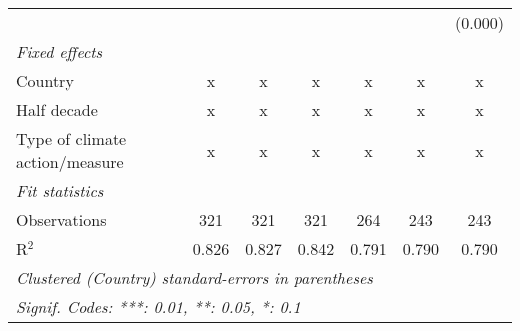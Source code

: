 \begin{tabular}{lcccccc}
                                                       &         &         &                &                &                & (0.000)\\   
   \emph{Fixed effects}\\
   Country                                             & x       & x       & x              & x              & x              & x\\  
   Half decade                                         & x       & x       & x              & x              & x              & x\\  
   Type of climate action/measure                      & x       & x       & x              & x              & x              & x\\  
   \midrule \emph{Fit statistics}\\
   Observations                                        & 321     & 321     & 321            & 264            & 243            & 243\\  
   R$^2$                                               & 0.826   & 0.827   & 0.842          & 0.791          & 0.790          & 0.790\\  
   \midrule
   \multicolumn{7}{l}{\emph{Clustered (Country) standard-errors in parentheses}}\\
   \multicolumn{7}{l}{\emph{Signif. Codes: ***: 0.01, **: 0.05, *: 0.1}}\\
\end{tabular}
\par\endgroup


